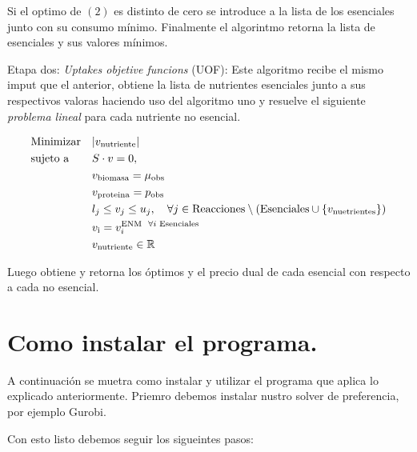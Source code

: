 \documentclass[letterpaper,12pt]{article}
\theoremstyle{definition}
\theoremstyle{remark}
\begin{document}
\noindent Si el optimo de $(2)$ es distinto de cero se introduce a la lista de los  esenciales junto con su consumo mínimo. Finalmente el algorintmo retorna la lista de esenciales y sus valores mínimos. 

\vspace{0.3 cm}

\noindent Etapa dos: \textit{ Uptakes objetive funcions} (UOF): Este algoritmo recibe el mismo imput que el anterior, obtiene la lista de nutrientes esenciales junto a sus respectivos valoras haciendo uso del algoritmo uno y resuelve el siguiente \textit{problema lineal} para cada nutriente no esencial.


\begin{equation}
 \begin{aligned}
        & {\text{Minimizar}} & &| v_{\text{nutriente}}| \\
        & \text{sujeto a}               & & S \cdot v = 0, \\
        &                                && v_{\text{biomasa}}=\mu_{\text{obs}}\\
          &                               && v_{\text{proteina}}=p_{\text{obs}}\\
        &                                & & l_j \le v_j \le u_j, \quad \forall j \in\text{Reacciones}\setminus (\text{Esenciales}\cup \{v_\text{nuetrientes}\})\\
        &                                && v_\text{i}=v_i^{\text{ENM} \hspace{0.2 cm}\forall i \text{ Esenciales}}\\
        &  &&v_{\text{nutriente}}\in \mathbb{R}
    \end{aligned}
\end{equation}

Luego obtiene y retorna los óptimos y el precio dual de cada esencial con respecto a cada no esencial.


\newpage

\section{Como instalar el programa.}

\noindent A continuación se muetra como instalar y utilizar el programa que aplica lo explicado anteriormente. Priemro debemos instalar nustro solver de preferencia, por ejemplo Gurobi.


\noindent Con esto listo debemos seguir los sigueintes pasos:
\end{document}
